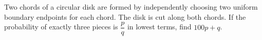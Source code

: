 Two chords of a circular disk are formed by independently choosing two uniform boundary endpoints for each chord. The disk is cut along both chords. If the probability of exactly three pieces is $\dfrac{p}{q}$ in lowest terms, find $ 100p+q $.
